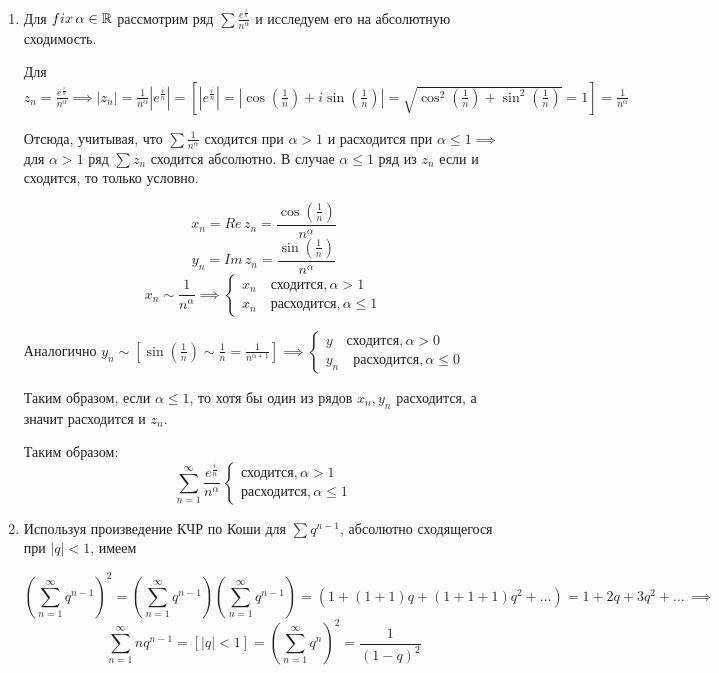 \documentclass[../../main.tex]{subfiles}
\begin{document}
\begin{exmp}
	\;
	\begin{enumerate}
		\item Для $ fix\, \alpha \in \mathbb{R} $ рассмотрим ряд $ \sum \frac{e^{\frac{i}{n}}}{n^\alpha} $ и исследуем его на абсолютную сходимость.
		
		Для $ z_n = \frac{e^{\frac{i}{n}}}{n^\alpha} \implies |z_n| = \frac{1}{n^\alpha} |e^{\frac{i}{n}}| = [|e^{\frac{i}{n}}| = |\cos(\frac{1}{n}) + i\sin(\frac{1}{n})| = \sqrt{\cos^2(\frac{1}{n}) + \sin^2(\frac{1}{n})} = 1] = \frac{1}{n^\alpha} $
		
		Отсюда, учитывая, что $ \sum \frac{1}{n^\alpha} $ сходится при $ \alpha > 1 $ и расходится при $ \alpha \leq 1 \implies $ для $ \alpha > 1 $ ряд $
		\sum z_n $ сходится абсолютно. В случае $ \alpha \leq 1 $ ряд из $ z_n $ если и сходится, то только условно.
		
		\[x_n = Re\, z_n = \frac{\cos(\frac{1}{n})}{n^\alpha}\]
		\[y_n = Im\, z_n = \frac{\sin(\frac{1}{n})}{n^\alpha}\]
		\[x_n \sim \frac{1}{n^\alpha} \implies 
		\begin{cases}
			x_n \quad \text{сходится}, \alpha > 1 \\
			x_n \quad \text{расходится}, \alpha \leq 1
		\end{cases}\]
		
		Аналогично $ y_n \sim [\sin(\frac{1}{n}) \sim \frac{1}{n} = \frac{1}{n^{\alpha + 1}}] \implies
		\begin{cases}
		y \quad \text{сходится}, \alpha > 0 \\
		y_n \quad \text{расходится}, \alpha \leq 0
		\end{cases} $
		
		Таким образом, если $ \alpha \leq 1 $, то хотя бы один из рядов $ x_n, y_n $ расходится, а значит расходится и $ z_n $.
		
		Таким образом:
		\[ \sum_{n=1}^{\infty}\frac{e^{\frac{i}{n}}}{n^\alpha}\,
		\begin{cases}
		\text{сходится}, \alpha > 1 \\
		\text{расходится}, \alpha \leq 1
		\end{cases}\]
		
	\item Используя произведение КЧР по Коши для $ \sum q^{n - 1} $, абсолютно сходящегося при $ |q| < 1 $, имеем
	
	\[(\sum_{n=1}^{\infty}q^{n - 1})^2 = (\sum_{n=1}^{\infty}q^{n - 1})(\sum_{n=1}^{\infty}q^{n - 1}) = (1 + (1 + 1)q + (1 + 1 + 1)q^2 + \ldots ) = 1 + 2q + 3q^2 + \ldots\, \implies \]
	\[\sum_{n=1}^{\infty}nq^{n - 1} = [|q| < 1] = (\sum_{n=1}^{\infty}q^{n})^2 = \frac{1}{(1 - q)^2}\]
	\end{enumerate}
\end{exmp}
\end{document}
